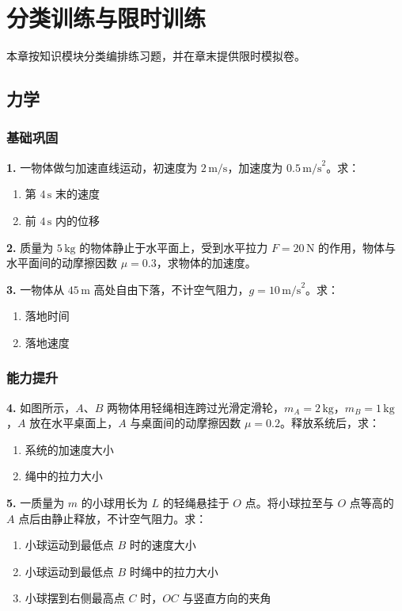 \section{分类训练与限时训练}

本章按知识模块分类编排练习题，并在章末提供限时模拟卷。

\subsection{力学}

\subsubsection{基础巩固}

\textbf{1.} 一物体做匀加速直线运动，初速度为 $2\,\text{m/s}$，加速度为 $0.5\,\text{m/s}^2$。求：
\begin{enumerate}
  \item 第 $4\,\text{s}$ 末的速度
  \item 前 $4\,\text{s}$ 内的位移
\end{enumerate}

\textbf{2.} 质量为 $5\,\text{kg}$ 的物体静止于水平面上，受到水平拉力 $F = 20\,\text{N}$ 的作用，物体与水平面间的动摩擦因数 $\mu = 0.3$，求物体的加速度。

\textbf{3.} 一物体从 $45\,\text{m}$ 高处自由下落，不计空气阻力，$g = 10\,\text{m/s}^2$。求：
\begin{enumerate}
  \item 落地时间
  \item 落地速度
\end{enumerate}

\subsubsection{能力提升}

\textbf{4.} 如图所示，$A$、$B$ 两物体用轻绳相连跨过光滑定滑轮，$m_A = 2\,\text{kg}$，$m_B = 1\,\text{kg}$，$A$ 放在水平桌面上，$A$ 与桌面间的动摩擦因数 $\mu = 0.2$。释放系统后，求：
\begin{enumerate}
  \item 系统的加速度大小
  \item 绳中的拉力大小
\end{enumerate}

\textbf{5.} 一质量为 $m$ 的小球用长为 $L$ 的轻绳悬挂于 $O$ 点。将小球拉至与 $O$ 点等高的 $A$ 点后由静止释放，不计空气阻力。求：
\begin{enumerate}
  \item 小球运动到最低点 $B$ 时的速度大小
  \item 小球运动到最低点 $B$ 时绳中的拉力大小
  \item 小球摆到右侧最高点 $C$ 时，$OC$ 与竖直方向的夹角
\end{enumerate}

